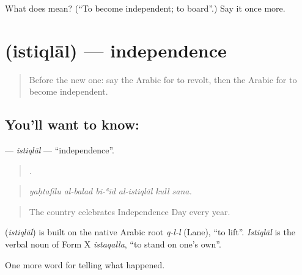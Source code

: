 \begin{tcolorbox}[breakable,colback=teal!4,colframe=teal!35!black,title={Before you move on}]
What does  mean? (\textquotedblleft{}To become independent; to board\textquotedblright{}.) Say it once more.
\end{tcolorbox}
\section[\texorpdfstring{\ar{استقلال} (istiqlāl)}{استقلال (istiqlāl)}]{ (istiqlāl) — independence}

\label{lesson:AR-C329-istiqlal}



\begin{quote}
Before the new one: say the Arabic for to revolt, then the Arabic for to become independent.
\end{quote}

\subsection*{You'll want to know: }
\textbf{} — \emph{istiqlāl} — \textquotedblleft{}independence\textquotedblright{}.

\begin{quote}
     .
\end{quote}

\begin{quote}
\emph{yaḥtafilu al-balad bi-ʿīd al-istiqlāl kull sana.}
\end{quote}

\begin{quote}
The country celebrates Independence Day every year.
\end{quote}

\begin{cousinweb}
\textbf{} (\emph{istiqlāl}) is built on the native Arabic root \emph{q-l-l} (Lane), \textquotedblleft{}to lift\textquotedblright{}. \emph{Istiqlāl} is the verbal noun of Form X \emph{istaqalla}, \textquotedblleft{}to stand on one's own\textquotedblright{}.
\end{cousinweb}

\begin{grammarlens}[title={What you've built}]
One more word for telling what happened.
\end{grammarlens}

